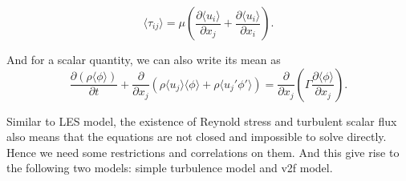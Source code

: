 \documentclass[english, nochinese]{pkupaper}
\begin{document}
\begin{equation}
	\langle\tau_{ij}\rangle = \mu\left(\frac{\partial\langle u_i\rangle}{\partial x_j} + \frac{\partial\langle u_i\rangle}{\partial x_i}\right).
\end{equation}
\par And for a scalar quantity, we can also write its mean as
\begin{equation}
	\frac{\partial(\rho\langle\phi\rangle)}{\partial t} + \frac{\partial}{\partial x_j}\left(\rho\langle u_j\rangle\langle\phi\rangle + \rho\langle u_j'\phi'\rangle\right) = \frac{\partial}{\partial x_j}\left(\Gamma\frac{\partial\langle\phi\rangle}{\partial x_j}\right).
\end{equation}
\par Similar to LES model, the existence of Reynold stress and turbulent scalar flux also means that the equations are not closed and impossible to solve directly. Hence we need some restrictions and correlations on them. And this give rise to the following two models: simple turbulence model and v2f model.
\end{document}
